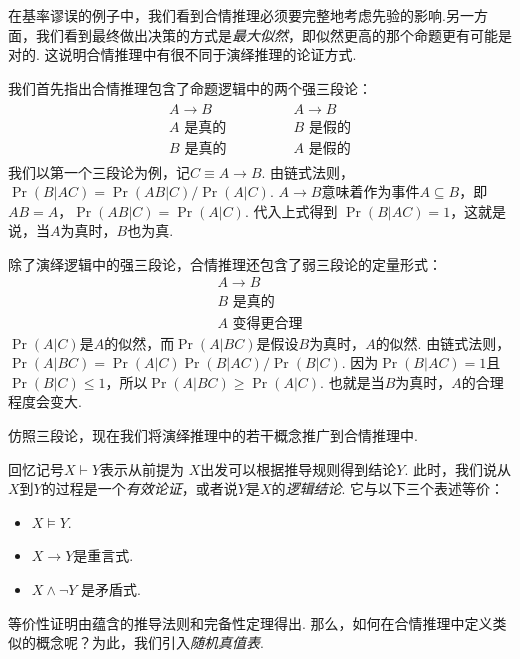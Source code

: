 在基率谬误的例子中，我们看到合情推理必须要完整地考虑先验的影响.另一方面，我们看到最终做出决策的方式是\textit{最大似然}，即似然更高的那个命题更有可能是对的. 这说明合情推理中有很不同于演绎推理的论证方式.

我们首先指出合情推理包含了命题逻辑中的两个强三段论：
        \[
        \begin{array}{c}
            \begin{array}{c}  
                A \to B \\ A\text{ 是真的} \\ \hline B\text{ 是真的}
            \end{array} 
            \qquad \qquad 
            \begin{array}{c}  
                A \to B \\ B\text{ 是假的} \\ \hline A\text{ 是假的}
            \end{array}
        \end{array} 
    \]
我们以第一个三段论为例，记$C \equiv A \to B$. 由链式法则，$\Pr(B|AC) = \Pr(AB|C) / \Pr(A|C)$. $A \to B$意味着作为事件$A\subseteq B$，即$AB=A$，$\Pr(AB|C) = \Pr(A|C)$. 代入上式得到 $\Pr(B|AC) = 1$，这就是说，当$A$为真时，$B$也为真.

除了演绎逻辑中的强三段论，合情推理还包含了弱三段论的定量形式：
    \[\begin{array}{c}  
            A \to B \\ B\text{ 是真的} \\ \hline A\text{ 变得更合理}
        \end{array}\]
$\Pr(A|C)$是$A$的似然，而$\Pr(A|BC)$是假设$B$为真时，$A$的似然. 由链式法则，$\Pr(A|BC) = \Pr(A|C)\Pr(B|AC)/\Pr(B|C)$. 因为$\Pr(B|AC) = 1$且$\Pr(B|C)\leq 1$，所以$\Pr(A|BC) \geq \Pr(A|C)$. 也就是当$B$为真时，$A$的合理程度会变大.

仿照三段论，现在我们将演绎推理中的若干概念推广到合情推理中. 

回忆记号$X\vdash Y$表示从前提为 $X$出发可以根据推导规则得到结论$Y$. 此时，我们说从$X$到$Y$的过程是一个\textit{有效论证}，或者说$Y$是$X$的\textit{逻辑结论}. 它与以下三个表述等价：
    \begin{itemize}
        \item $X\vDash Y$.
        \item  $X\to Y$是重言式.
        \item $X\wedge \neg Y$ 是矛盾式.
    \end{itemize}
等价性证明由蕴含的推导法则和完备性定理得出. 那么，如何在合情推理中定义类似的概念呢？为此，我们引入\textit{随机真值表}. 

